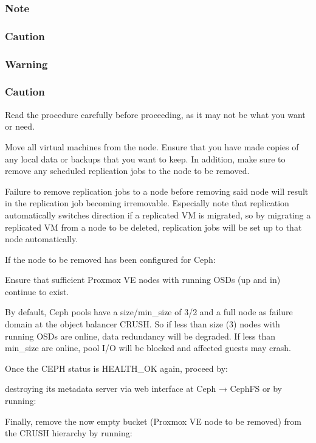 \subsubsection{Note}

\subsubsection{Caution}

\subsubsection{Warning}

\subsubsection{Caution}

Read the procedure carefully before proceeding, as it may not be what you want or need.

Move all virtual machines from the node. Ensure that you have made copies of any local data or backups that you want to keep. In addition, make sure to remove any scheduled replication jobs to the node to be removed.

Failure to remove replication jobs to a node before removing said node will result in the replication job becoming irremovable. Especially note that replication automatically switches direction if a replicated VM is migrated, so by migrating a replicated VM from a node to be deleted, replication jobs will be set up to that node automatically.

If the node to be removed has been configured for Ceph:

Ensure that sufficient Proxmox VE nodes with running OSDs (up and in) continue to exist.

By default, Ceph pools have a size/min_size of 3/2 and a full node as failure domain at the object balancer CRUSH. So if less than size (3) nodes with running OSDs are online, data redundancy will be degraded. If less than min_size are online, pool I/O will be blocked and affected guests may crash.

Once the CEPH status is HEALTH_OK again, proceed by:

destroying its metadata server via web interface at Ceph → CephFS or by running:

Finally, remove the now empty bucket (Proxmox VE node to be removed) from the CRUSH hierarchy by running:

